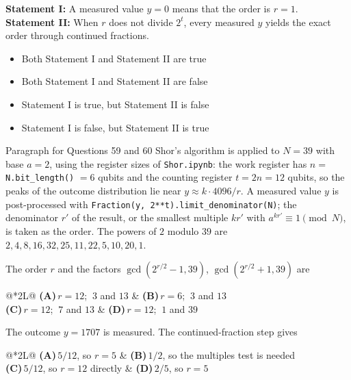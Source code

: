 \documentclass[11pt,a4paper]{article}
\newcommand{\optlabel}[1]{\textbf{(#1)}}
\newenvironment{qitem}[1]{\begin{list}{}{\setlength{\leftmargin}{3.3em}\setlength{\labelwidth}{3.1em}%
  \setlength{\labelsep}{0.2em}\setlength{\topsep}{3pt}\setlength{\parsep}{3pt}}\item[\textbf{Q.#1}\hfill]}{\end{list}}
\newcommand{\qsep}{\par\vspace{2pt}{\color{black!15}\hrule}\vspace{4pt}}
\begin{document}
\begin{qitem}{58}
\textbf{Statement I:} A measured value $y = 0$ means that the order is $r = 1$.\\[1mm]
\textbf{Statement II:} When $r$ does not divide $2^t$, every measured $y$ yields the exact order through continued fractions.
\begin{itemize}[leftmargin=2.6em, labelsep=0.4em, itemsep=2pt, topsep=3pt]
\item[\optlabel{A}] Both Statement I and Statement II are true
\item[\optlabel{B}] Both Statement I and Statement II are false
\item[\optlabel{C}] Statement I is true, but Statement II is false
\item[\optlabel{D}] Statement I is false, but Statement II is true
\end{itemize}
\end{qitem}
\qsep

\begin{passagebox}{Paragraph for Questions 59 and 60}
Shor's algorithm is applied to $N = 39$ with base $a = 2$, using the register sizes of \texttt{Shor.ipynb}: the work register has
$n = $ \texttt{N.bit\_length()} $= 6$ qubits and the counting register $t = 2n = 12$ qubits, so the peaks of the outcome distribution lie near
$y \approx k\cdot4096/r$. A measured value $y$ is post-processed with \texttt{Fraction(y, 2**t).limit\_denominator(N)}; the denominator $r'$ of the
result, or the smallest multiple $kr'$ with $a^{kr'} \equiv 1 \pmod N$, is taken as the order. The powers of $2$ modulo $39$ are
$2, 4, 8, 16, 32, 25, 11, 22, 5, 10, 20, 1$.
\end{passagebox}
\begin{qitem}{59}
The order $r$ and the factors $\gcd(2^{r/2} - 1, 39)$, $\gcd(2^{r/2} + 1, 39)$ are
\par\smallskip\noindent\begin{tabularx}{\linewidth}{@{}*{2}{L}@{}}
\optlabel{A}\,$r = 12$; $\ 3$ and $13$ & \optlabel{B}\,$r = 6$; $\ 3$ and $13$ \\[3pt]
\optlabel{C}\,$r = 12$; $\ 7$ and $13$ & \optlabel{D}\,$r = 12$; $\ 1$ and $39$
\end{tabularx}
\end{qitem}
\qsep

\begin{qitem}{60}
The outcome $y = 1707$ is measured. The continued-fraction step gives
\par\smallskip\noindent\begin{tabularx}{\linewidth}{@{}*{2}{L}@{}}
\optlabel{A}\,$5/12$, so $r = 5$ & \optlabel{B}\,$1/2$, so the multiples test is needed \\[3pt]
\optlabel{C}\,$5/12$, so $r = 12$ directly & \optlabel{D}\,$2/5$, so $r = 5$
\end{tabularx}
\end{qitem}
\qsep
\end{document}
